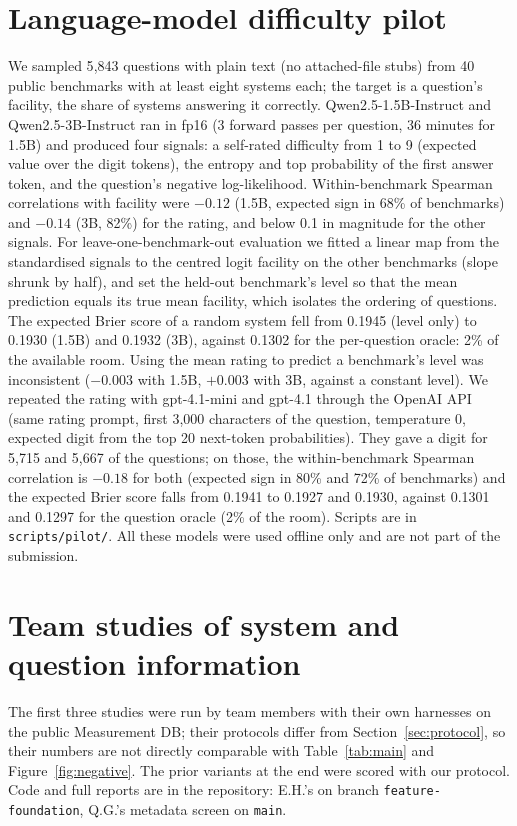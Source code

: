 \documentclass{article}
\newcommand{\code}[1]{\texttt{#1}}
\begin{document}
\section{Language-model difficulty pilot}
\label{app:lm}
We sampled 5{,}843 questions with plain text (no attached-file stubs) from 40 public benchmarks with at least eight systems each; the target is a question's facility, the share of systems answering it correctly. Qwen2.5-1.5B-Instruct and Qwen2.5-3B-Instruct ran in fp16 (3 forward passes per question, 36 minutes for 1.5B) and produced four signals: a self-rated difficulty from 1 to 9 (expected value over the digit tokens), the entropy and top probability of the first answer token, and the question's negative log-likelihood. Within-benchmark Spearman correlations with facility were $-0.12$ (1.5B, expected sign in 68\% of benchmarks) and $-0.14$ (3B, 82\%) for the rating, and below 0.1 in magnitude for the other signals. For leave-one-benchmark-out evaluation we fitted a linear map from the standardised signals to the centred logit facility on the other benchmarks (slope shrunk by half), and set the held-out benchmark's level so that the mean prediction equals its true mean facility, which isolates the ordering of questions. The expected Brier score of a random system fell from 0.1945 (level only) to 0.1930 (1.5B) and 0.1932 (3B), against 0.1302 for the per-question oracle: 2\% of the available room. Using the mean rating to predict a benchmark's level was inconsistent ($-0.003$ with 1.5B, $+0.003$ with 3B, against a constant level). We repeated the rating with gpt-4.1-mini and gpt-4.1 through the OpenAI API (same rating prompt, first 3{,}000 characters of the question, temperature 0, expected digit from the top 20 next-token probabilities). They gave a digit for 5{,}715 and 5{,}667 of the questions; on those, the within-benchmark Spearman correlation is $-0.18$ for both (expected sign in 80\% and 72\% of benchmarks) and the expected Brier score falls from 0.1941 to 0.1927 and 0.1930, against 0.1301 and 0.1297 for the question oracle (2\% of the room). Scripts are in \code{scripts/pilot/}. All these models were used offline only and are not part of the submission.

\section{Team studies of system and question information}
\label{app:team}
The first three studies were run by team members with their own harnesses on the public Measurement DB; their protocols differ from Section~\ref{sec:protocol}, so their numbers are not directly comparable with Table~\ref{tab:main} and Figure~\ref{fig:negative}. The prior variants at the end were scored with our protocol. Code and full reports are in the repository: E.H.'s on branch \code{feature-foundation}, Q.G.'s metadata screen on \code{main}.
\end{document}
